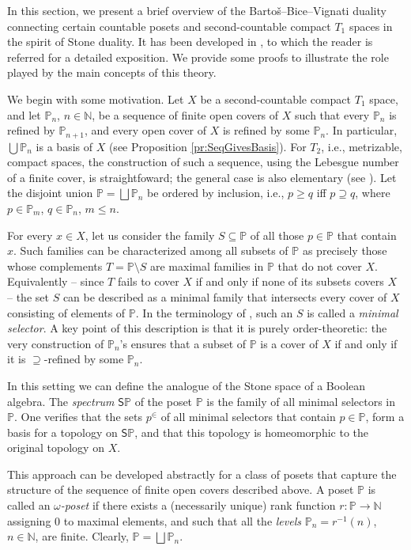 \documentclass[12pt]{amsart}
\theoremstyle{plain}
\newcommand \Sp{{\mathsf{S}}}
\newcommand \NN{\mathbb{N}}
\newcommand \PPb{\mathbb{P}}
\begin{document}
In this section, we present a brief overview of the  Barto\v s–Bice–Vignati duality connecting certain countable posets and second-countable compact $T_1$  spaces in the spirit of Stone duality. It has  been developed in \cite{BaBiVi}, to which the reader is referred for a detailed exposition. We provide some proofs to illustrate the role played by the main concepts of this theory.

We begin with some motivation. Let $X$ be a second-countable compact $T_1$ space, and let $\PPb_n$, $n \in \NN$, be a sequence  of finite open covers of $X$ such that every $\PPb_{n}$ is refined by $\PPb_{n+1}$, and every open cover of $X$ is refined by some $\PPb_n$. In particular, $\bigcup \PPb_n$ is a basis of $X$ (see Proposition \ref{pr:SeqGivesBasis}).  For $T_2$, i.e., metrizable, compact spaces, the construction of such a sequence, using the Lebesgue number of a finite cover, is straightfoward; the general case is also elementary (see \cite[Proposition 1.11]{BaBiVi}). Let the disjoint union $\PPb= \bigsqcup \PPb_n$ be ordered by inclusion, i.e., $p \geq q$ iff $p \supseteq q$, where $p \in \PPb_m$, $q \in \PPb_n$, $m \leq n$.   

For every $x \in X$, let us consider the family $S \subseteq \PPb$ of all those $p \in \PPb$ that contain $x$. Such families can be characterized among all subsets of $\PPb$  as precisely those whose complements $T=\PPb \setminus S$ are maximal families in $\PPb$ that do not cover $X$.  Equivalently -- since $T$ fails to cover $X$ if and only if none of its subsets covers  $X$
-- the set $S$ can be described as a minimal family that intersects every cover of  $X$ consisting of elements of  $\PPb$. In the terminology of \cite{BaBiVi}, such an $S$ is called a \emph{minimal selector}. A key point of this description is that it is purely order-theoretic: the very construction of $\PPb_n$'s ensures that a subset of $\PPb$ is a cover of $X$ if and only if it is $\supseteq$-refined by some $\PPb_n$.

In this setting we can define the analogue of the Stone space of a Boolean algebra. The \emph{spectrum} $\Sp \PPb$ of the poset $\PPb$ is the family of all minimal selectors in $\PPb$. One verifies that the sets $p^\in$ of all minimal selectors that contain $p \in \PPb$, form a basis for a topology on $\Sp \PPb$, and that this topology is homeomorphic to the original topology on $X$.

This approach can be developed abstractly for a class of posets that capture the structure of the sequence of finite open covers described above. A poset $\PPb$ is called an \emph{$\omega$-poset} if there exists a (necessarily unique) rank function  $r:\PPb \to \NN$ assigning $0$ to maximal elements, and such that all the \emph{levels} $\PPb_n=r^{-1}(n)$, $n \in \NN$, are finite.  Clearly, $\PPb=\bigsqcup \PPb_n$.
\end{document}
